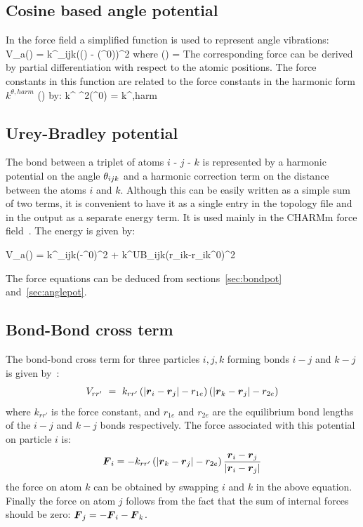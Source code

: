 \subsection{Cosine based angle potential}
\label{sec:cosangle}
In the  force field a simplified function is used to represent angle
vibrations:
\beq
V_a(\tijk) = \half k^{\theta}_{ijk}\left(\cos(\tijk) - \cos(\tijk^0)\right)^2
\eeq
where 
\beq
\cos(\tijk) = 
\eeq
The corresponding force can be derived by partial differentiation with respect
to the atomic positions. The force constants in this function are related
to the force constants in the harmonic form $k^{\theta,harm}$
() by:
\beq
k^{\theta} \sin^2(\tijk^0) = k^{\theta,harm}
\eeq

\subsection{Urey-Bradley potential}
\label{sec:urey-bradley}
The bond  between a triplet
of atoms $i$ - $j$ - $k$ is represented by a harmonic potential on the
angle $\theta_{ijk}$ and a harmonic correction term on the distance between
the atoms $i$ and $k$. Although this can be easily written as a simple
sum of two terms, it is convenient to have it as a single entry in the
topology file and in the output as a separate energy term. It is used mainly
in the CHARMm force field~\cite{BBrooks83}. The energy is given by:

\beq
V_a(\tijk) = \half k^{\theta}_{ijk}(\tijk-\tijk^0)^2 + \half k^{UB}_{ijk}(r_{ik}-r_{ik}^0)^2
\eeq

The force equations can be deduced from sections~\ref{sec:bondpot}
and~\ref{sec:anglepot}.

\subsection{Bond-Bond cross term}
The bond-bond cross term for three particles $i, j, k$ forming bonds
$i-j$ and $k-j$ is given by~\cite{Lawrence2003a}:
\begin{equation}
V_{rr'} ~=~ k_{rr'} \left(\left|\mbox{\boldmath ${r}$}_{i}-\mbox{\boldmath ${r}$}_j\right|-r_{1e}\right) \left(\left|\mbox{\boldmath ${r}$}_{k}-\mbox{\boldmath ${r}$}_j\right|-r_{2e}\right)
\label{crossbb}
\end{equation}
where $k_{rr'}$ is the force constant, and $r_{1e}$ and $r_{2e}$ are the
equilibrium bond lengths of the $i-j$ and $k-j$ bonds respectively. The force
associated with this potential on particle $i$ is:
\begin{equation}
\mbox{\boldmath ${F}$}_{i} = -k_{rr'}\left(\left|\mbox{\boldmath ${r}$}_{k}-\mbox{\boldmath ${r}$}_j\right|-r_{2e}\right)\frac{\mbox{\boldmath ${r}$}_i-\mbox{\boldmath ${r}$}_j}{\left|\mbox{\boldmath ${r}$}_{i}-\mbox{\boldmath ${r}$}_j\right|}
\end{equation}
the force on atom $k$ can be obtained by swapping $i$ and $k$ in the above
equation. Finally the force on atom $j$ follows from the fact that the sum
of internal forces should be zero: $\mbox{\boldmath ${F}$}_j = -\mbox{\boldmath ${F}$}_i-\mbox{\boldmath ${F}$}_k$.

